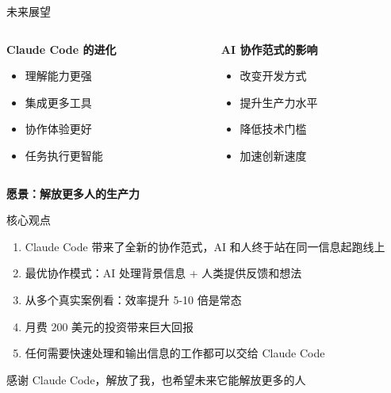 \documentclass[aspectratio=169,xcolor=dvipsnames]{beamer}
\begin{document}
\begin{frame}{未来展望}
  \begin{columns}
    \begin{column}{0.48\textwidth}
      \textbf{Claude Code 的进化}
      \begin{itemize}
        \item 理解能力更强
        \item 集成更多工具
        \item 协作体验更好
        \item 任务执行更智能
      \end{itemize}
    \end{column}
    \begin{column}{0.48\textwidth}
      \textbf{AI 协作范式的影响}
      \begin{itemize}
        \item 改变开发方式
        \item 提升生产力水平
        \item 降低技术门槛
        \item 加速创新速度
      \end{itemize}
    \end{column}
  \end{columns}

  \vspace{0.5cm}

  \begin{center}
    \large
    \textbf{愿景：解放更多人的生产力}
  \end{center}
\end{frame}

\begin{frame}{核心观点}
  \begin{enumerate}
    \item Claude Code 带来了全新的协作范式，AI 和人终于站在同一信息起跑线上

    \vspace{0.3cm}

    \item 最优协作模式：AI 处理背景信息 + 人类提供反馈和想法

    \vspace{0.3cm}

    \item 从多个真实案例看：效率提升 5-10 倍是常态

    \vspace{0.3cm}

    \item 月费 200 美元的投资带来巨大回报

    \vspace{0.3cm}

    \item 任何需要快速处理和输出信息的工作都可以交给 Claude Code
  \end{enumerate}

  \vspace{0.3cm}

  \begin{center}
    \Large
    感谢 Claude Code，解放了我，也希望未来它能解放更多的人
  \end{center}
\end{frame}
\end{document}

